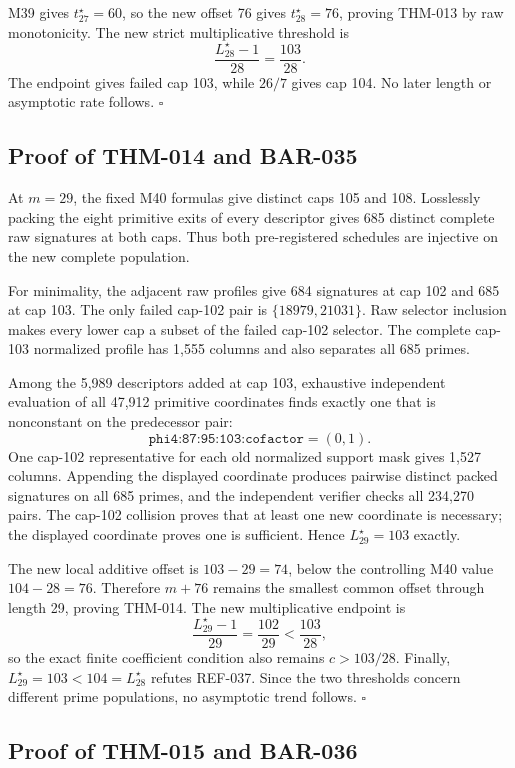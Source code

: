 \documentclass[11pt]{article}
\begin{document}
M39 gives \(t_{27}^\star=60\), so the new offset 76 gives
\(t_{28}^\star=76\), proving THM-013 by raw monotonicity. The new strict
multiplicative threshold is
\[
\frac{L_{28}^\star-1}{28}=\frac{103}{28}.
\]
The endpoint gives failed cap 103, while \(26/7\) gives cap 104. No later
length or asymptotic rate follows. \(\square\)

\subsection{Proof of THM-014 and BAR-035}
\label{proof:THM-014-BAR-035}

At \(m=29\), the fixed M40 formulas give distinct caps 105 and 108.
Losslessly packing the eight primitive exits of every descriptor gives 685
distinct complete raw signatures at both caps. Thus both pre-registered
schedules are injective on the new complete population.

For minimality, the adjacent raw profiles give 684 signatures at cap 102
and 685 at cap 103. The only failed cap-102 pair is
\(\{18979,21031\}\). Raw selector inclusion makes every lower cap a subset
of the failed cap-102 selector. The complete cap-103 normalized profile has
1,555 columns and also separates all 685 primes.

Among the 5,989 descriptors added at cap 103, exhaustive independent
evaluation of all 47,912 primitive coordinates finds exactly one that is
nonconstant on the predecessor pair:
\[
\texttt{phi4:87:95:103:cofactor}=(0,1).
\]
One cap-102 representative for each old normalized support mask gives 1,527
columns. Appending the displayed coordinate produces pairwise distinct
packed signatures on all 685 primes, and the independent verifier checks all
234,270 pairs. The cap-102 collision proves that at least one new coordinate
is necessary; the displayed coordinate proves one is sufficient. Hence
\(L_{29}^{\star}=103\) exactly.

The new local additive offset is \(103-29=74\), below the controlling M40
value \(104-28=76\). Therefore \(m+76\) remains the smallest common offset
through length 29, proving THM-014. The new multiplicative endpoint is
\[
\frac{L_{29}^{\star}-1}{29}=\frac{102}{29}
 < \frac{103}{28},
\]
so the exact finite coefficient condition also remains \(c>103/28\).
Finally, \(L_{29}^{\star}=103<104=L_{28}^{\star}\) refutes REF-037. Since
the two thresholds concern different prime populations, no asymptotic trend
follows. \(\square\)

\subsection{Proof of THM-015 and BAR-036}
\label{proof:THM-015-BAR-036}
\end{document}
